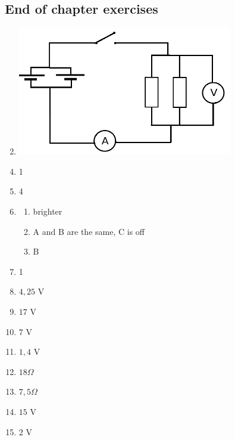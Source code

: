 \subsection{End of chapter exercises}
\begin{enumerate}[noitemsep, label=\textbf{(\arabic*)} ]
\setcounter{enumi}{1}
 \item \includegraphics[width=.3\textwidth]{photos/electric_circuits_circuitdiagrm.png}
\end{enumerate}
\begin{multicols}{3}
 \begin{enumerate}[noitemsep, label=\textbf{(\arabic*)} ]
\setcounter{enumi}{3}
\item 1
\item 4
\item 
 \begin{enumerate}[noitemsep, label=\textbf{(\alph*)} ]
\item brighter
\item A and B are the same, C is off
\item B
\end{enumerate}
\item 1
\item $4,25 \text{ V}$
\item $17 \text{ V}$
\item $7 \text{ V}$
\item $1,4 \text{ V}$
\item $18 \Omega$
\item $7,5 \Omega$
\item $15 \text{ V}$
\item $2 \text{ V}$
 \end{enumerate}
\end{multicols}


